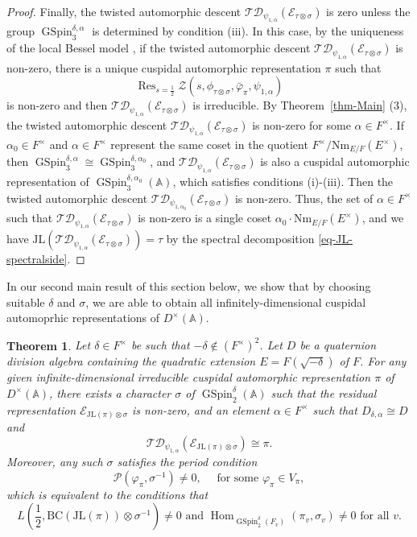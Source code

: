 \documentclass[12pt]{amsart}
\newcommand{\A}{\mathbb{A}}
\newcommand{\Hom}{\operatorname{Hom}}
\newcommand{\Res}{\operatorname{Res}}
\newcommand{\JL}{\mathrm{JL}}
\newcommand{\BC}{\mathrm{BC}}
\newcommand{\TD}{\mathcal{TD}}
\newcommand{\CE}{{\mathcal{E}}}
\newtheorem{theorem}{Theorem}[section]
\theoremstyle{remark}
\DeclareMathOperator{\GSpin}{GSpin}
\begin{document}
\begin{proof}
Finally, the twisted automorphic descent $\TD_{\psi_{1,\alpha}} (\CE_{\tau\otimes\sigma})$ is zero unless the group $\GSpin_3^{\delta, \alpha}$ is determined by condition (iii). 
In this case, by the uniqueness of the local Bessel model \cite{Yan2025}, if the twisted automorphic descent $\TD_{\psi_{1,\alpha}} (\CE_{\tau\otimes\sigma})$ is non-zero, there is a unique cuspidal automorphic representation $\pi$ such that 
$$\Res_{s=\frac{1}{2}}\mathcal{Z}(s,\phi_{\tau\otimes\sigma},\bar{\varphi}_{\pi},\psi_{1,\alpha})$$ 
is non-zero and then $\TD_{\psi_{1,\alpha}} (\CE_{\tau\otimes\sigma})$ is irreducible. 
By Theorem~\ref{thm-Main} (3), the twisted automorphic descent $\TD_{\psi_{1,\alpha}} (\CE_{\tau\otimes\sigma})$ is non-zero for some $\alpha\in F^\times$. If $\alpha_0\in F^\times$ and $\alpha\in F^\times$ represent the same coset in the quotient $F^\times/ \mathrm{Nm}_{E/F} (E^\times)$, then $\GSpin_3^{\delta,\alpha}\cong \GSpin_3^{\delta, \alpha_0}$, and  $\TD_{\psi_{1,\alpha}} (\CE_{\tau\otimes\sigma})$  is also a cuspidal automorphic representation of $\GSpin_3^{\delta,\alpha_0}(\A)$, which satisfies conditions (i)-(iii). Then the twisted automorphic descent $\TD_{\psi_{1,\alpha_0}} (\CE_{\tau\otimes\sigma})$ is non-zero. Thus, the set of $\alpha\in F^\times$ such that $\TD_{\psi_{1,\alpha}} (\CE_{\tau\otimes\sigma})$ is non-zero is a single coset $\alpha_0\cdot \mathrm{Nm}_{E/F} (E^\times)$, and we have $\JL( \TD_{\psi_{1,\alpha}} (\CE_{\tau\otimes\sigma}))=\tau$ by the spectral decomposition \eqref{eq-JL-spectralside}.
\end{proof}

In our second main result of this section below, we show that by choosing suitable $\delta$ and $\sigma$, we are able to obtain all infinitely-dimensional cuspidal automoprhic representations of $D^\times(\A)$. 

\begin{theorem}
\label{thm-JL-2}	
Let $\delta\in F^\times$ be such that $-\delta\not\in (F^\times)^2$. Let $D$ be a quaternion division algebra containing the quadratic extension $E=F(\sqrt{-\delta})$ of $F$. For any given infinite-dimensional irreducible cuspidal automorphic representation $\pi$ of $D^\times(\A)$, there exists a character $\sigma$ of $\GSpin_2^{\delta}(\A)$ such that the residual representation $\CE_{\JL(\pi)\otimes \sigma}$ is non-zero, and an element $\alpha\in F^\times$ such that $D_{\delta,\alpha}\cong D$ and 
\begin{equation*}
	\TD_{\psi_{1,\alpha}} (\CE_{\JL(\pi)\otimes\sigma})\cong \pi.
\end{equation*}
Moreover, any such $\sigma$ satisfies the period condition 
\begin{equation*}
	\mathcal{P}(\varphi_\pi, \sigma^{-1}) \not=0, \quad \text{ for some }\varphi_\pi \in V_\pi,
\end{equation*}
which is equivalent to the conditions that
\begin{equation*}
L(\frac{1}{2}, \BC(\JL(\pi))\otimes\sigma^{-1})\not=0 \text{ and } \Hom_{\GSpin_2^{\delta}(F_v)} (\pi_v,\sigma_v)\not=0 \text{ for all }v.	
\end{equation*}
\end{theorem}
\end{document}
